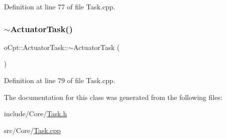 Definition at line 77 of file Task.\+cpp.

\hypertarget{classo_cpt_1_1_actuator_task_a829531567f8c0e660d2f4b541623915d}{}\label{classo_cpt_1_1_actuator_task_a829531567f8c0e660d2f4b541623915d} 
\subsubsection{\texorpdfstring{$\sim$\+Actuator\+Task()}{~ActuatorTask()}}
{\footnotesize\ttfamily o\+Cpt\+::\+Actuator\+Task\+::$\sim$\+Actuator\+Task (\begin{DoxyParamCaption}{ }\end{DoxyParamCaption})\hspace{0.3cm}{\ttfamily [virtual]}}



Definition at line 79 of file Task.\+cpp.



The documentation for this class was generated from the following files\+:\begin{DoxyCompactItemize}
\item 
include/\+Core/\hyperlink{_task_8h}{Task.\+h}\item 
src/\+Core/\hyperlink{_task_8cpp}{Task.\+cpp}\end{DoxyCompactItemize}
